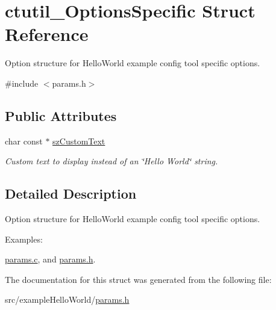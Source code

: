 \hypertarget{structctutil__OptionsSpecific}{}\section{ctutil\+\_\+\+Options\+Specific Struct Reference}
\label{structctutil__OptionsSpecific}


Option structure for Hello\+World example config tool specific options.  




{\ttfamily \#include $<$params.\+h$>$}

\subsection*{Public Attributes}
\begin{DoxyCompactItemize}
\item 
\hypertarget{structctutil__OptionsSpecific_a5bb026c3621ab3f392a4ac4d784065b2}{}\label{structctutil__OptionsSpecific_a5bb026c3621ab3f392a4ac4d784065b2} 
char const  $\ast$ \hyperlink{structctutil__OptionsSpecific_a5bb026c3621ab3f392a4ac4d784065b2}{sz\+Custom\+Text}
\begin{DoxyCompactList}\small\item\em Custom text to display instead of an \char`\"{}\+Hello World\char`\"{} string. \end{DoxyCompactList}\end{DoxyCompactItemize}


\subsection{Detailed Description}
Option structure for Hello\+World example config tool specific options. \begin{Desc}
\item[Examples\+: ]\par
\hyperlink{params_8c-example}{params.\+c}, and \hyperlink{params_8h-example}{params.\+h}.\end{Desc}


The documentation for this struct was generated from the following file\+:\begin{DoxyCompactItemize}
\item 
src/example\+Hello\+World/\hyperlink{params_8h}{params.\+h}\end{DoxyCompactItemize}
